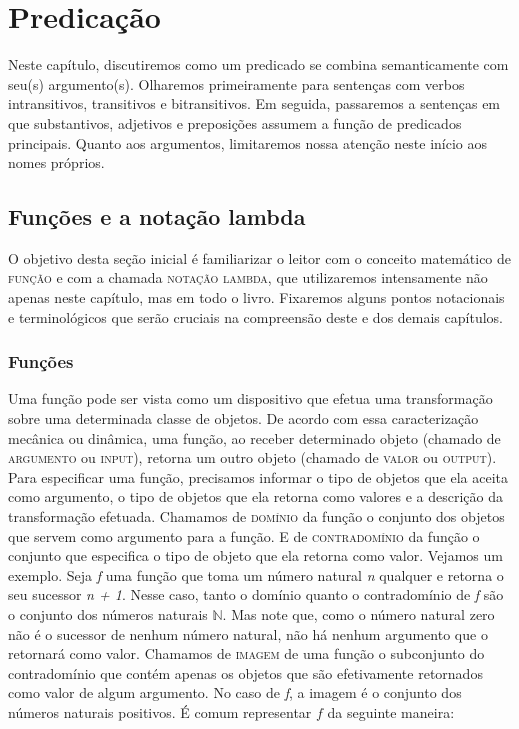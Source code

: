 
\chapter{Predicação}

Neste capítulo, discutiremos como um predicado se combina semanticamente com seu(s)
argumento(s). Olharemos primeiramente para sentenças com
verbos intransitivos, transitivos e bitransitivos. Em seguida,
passaremos a sentenças em que substantivos, adjetivos e
preposições assumem a função de predicados principais.
Quanto aos argumentos, limitaremos nossa atenção neste início
aos nomes próprios.


\section{Funções e a notação lambda}

O objetivo desta seção inicial é familiarizar o leitor com o conceito matemático de \textsc{função} e com a chamada \textsc{notação lambda}, que utilizaremos intensamente não apenas neste capítulo, mas em todo o livro. Fixaremos alguns pontos notacionais e terminológicos que serão cruciais na compreensão deste e dos demais capítulos.

\subsection{Funções}

Uma função pode ser vista como um dispositivo que efetua uma
transformação sobre uma determinada classe de objetos. De acordo
com essa caracterização mecânica ou dinâmica, uma função, ao
receber determinado objeto (chamado de \textsc{argumento} ou
\textsc{input}), retorna um outro objeto (chamado de
\textsc{valor} ou \textsc{output}). Para especificar uma função,
precisamos informar o tipo de objetos que ela aceita como
argumento, o tipo de objetos que ela retorna como valores e a
descrição da transformação efetuada. Chamamos de \textsc{domínio} da função o conjunto dos objetos que servem como argumento para a função. E de \textsc{contradomínio} da função o conjunto que especifica o
tipo de objeto que ela retorna como valor. Vejamos um exemplo. Seja \textit{f} uma
função que toma um número natural \textit{n} qualquer e retorna
o seu sucessor \textit{n + 1}. Nesse caso, tanto o domínio quanto
o contradomínio de \textit{f} são o conjunto dos números naturais
$\mathbb{N}$. Mas note que, como o número natural zero não é o
sucessor de nenhum número natural, não há nenhum argumento que o
retornará como valor. Chamamos de \textsc{imagem} de uma função o subconjunto do contradomínio que contém
apenas os objetos que são efetivamente retornados como valor de
algum argumento. No caso
de \textit{f}, a imagem é o conjunto dos números naturais
positivos. É comum representar $f$ da seguinte maneira:

